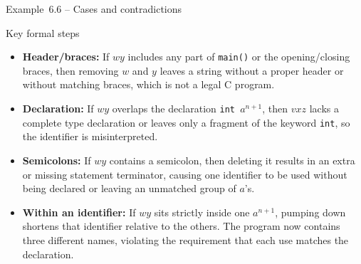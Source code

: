\begin{frame}[t]{Example 6.6 – Cases and contradictions}
  \begin{tblock}{Key formal steps}
    \begin{itemize}
      \item \textbf{Header/braces:} If $w y$ includes any part of
        \texttt{main()} or the opening/closing braces, then removing
        $w$ and $y$ leaves a string without a proper header or without
        matching braces, which is not a legal C program.
      \item \textbf{Declaration:} If $w y$ overlaps the declaration
        \texttt{int\ }$a^{n+1}$, then $v x z$ lacks a complete type
        declaration or leaves only a fragment of the keyword
        \texttt{int}, so the identifier is misinterpreted.
      \item \textbf{Semicolons:} If $w y$ contains a semicolon, then
        deleting it results in an extra or missing statement terminator,
        causing one identifier to be used without being declared or
        leaving an unmatched group of $a$’s.
      \item \textbf{Within an identifier:} If $w y$ sits strictly
        inside one $a^{n+1}$, pumping down shortens that identifier
        relative to the others.  The program now contains three
        different names, violating the requirement that each use matches
        the declaration.
    \end{itemize}
  \end{tblock}
  \label{fr:6.1-21}
\end{frame}

